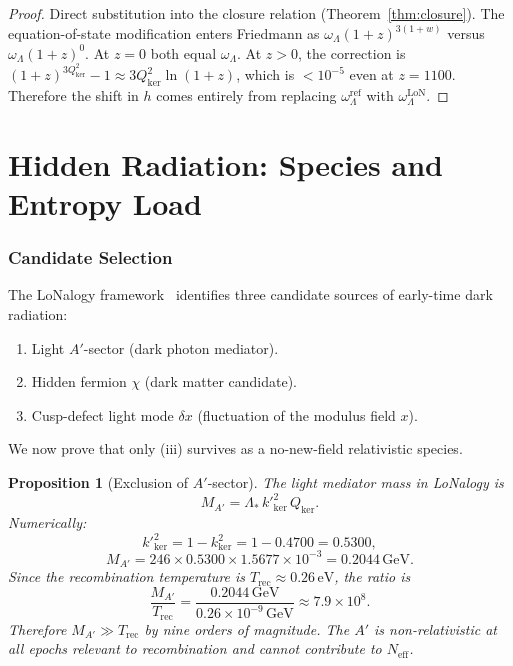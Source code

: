 \documentclass[12pt]{article}
\theoremstyle{plain}
\newtheorem{proposition}[theorem]{Proposition}
\theoremstyle{definition}
\numberwithin{equation}{section}
\newcommand{\kker}{\mathrm{ker}}
\newcommand{\eff}{\mathrm{eff}}
\newcommand{\LoN}{\mathrm{LoN}}
\begin{document}
\begin{proof}
Direct substitution into the closure relation (Theorem~\ref{thm:closure}).
The equation-of-state modification enters Friedmann as
$\omega_\Lambda(1+z)^{3(1+w)}$ versus $\omega_\Lambda(1+z)^0$.
At $z=0$ both equal $\omega_\Lambda$.
At $z>0$, the correction is $(1+z)^{3Q_{\kker}^2}-1\approx 3Q_{\kker}^2\ln(1+z)$,
which is $<10^{-5}$ even at $z=1100$.
Therefore the shift in $h$ comes entirely from replacing $\omega_\Lambda^{\mathrm{ref}}$
with $\omega_\Lambda^{\LoN}$.
\end{proof}


\part{Hidden Radiation: Species and Entropy Load}

\section{Candidate Selection}\label{sec:candidates}

The LoNalogy framework~\cite{LoNalogyv87,ParticleCosmo} identifies three
candidate sources of early-time dark radiation:

\begin{enumerate}[label=(\roman*)]
\item Light $A'$-sector (dark photon mediator).
\item Hidden fermion $\chi$ (dark matter candidate).
\item Cusp-defect light mode $\delta x$ (fluctuation of the modulus field $x$).
\end{enumerate}

We now prove that only (iii) survives as a no-new-field relativistic species.

\begin{proposition}[Exclusion of $A'$-sector]\label{prop:excA}
The light mediator mass in LoNalogy is
\begin{equation}
M_{A'} = \Lambda_*\,k'^2_{\kker}\,Q_{\kker}.
\end{equation}
Numerically:
\begin{equation}
k'^2_{\kker} = 1-k_{\kker}^2 = 1-0.4700 = 0.5300,
\end{equation}
\begin{equation}
M_{A'} = 246\times0.5300\times1.5677\times10^{-3} = 0.2044\,\mathrm{GeV}.
\end{equation}
Since the recombination temperature is
$T_{\mathrm{rec}}\approx0.26\,\mathrm{eV}$, the ratio is
\begin{equation}
\frac{M_{A'}}{T_{\mathrm{rec}}} = \frac{0.2044\,\mathrm{GeV}}{0.26\times10^{-9}\,\mathrm{GeV}}
\approx 7.9\times10^{8}.
\end{equation}
Therefore $M_{A'}\gg T_{\mathrm{rec}}$ by nine orders of magnitude.
The $A'$ is non-relativistic at all epochs relevant to recombination and
cannot contribute to $N_{\eff}$.
\end{proposition}
\end{document}
